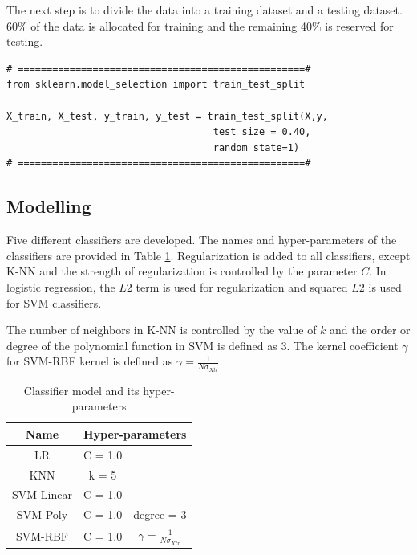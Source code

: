 The next step is to divide the data into a training dataset and a testing dataset. 60\% of the data is allocated for training and the remaining 40\% is reserved for testing.

\begin{lstlisting}
# ==================================================#
from sklearn.model_selection import train_test_split

X_train, X_test, y_train, y_test = train_test_split(X,y,
                                    test_size = 0.40,
                                    random_state=1)
# ==================================================#
\end{lstlisting}

\subsection{Modelling}
Five different classifiers are developed. The names and hyper-parameters of the classifiers are provided in Table \ref{tb:clf_parameters}.
Regularization is added to all classifiers, except K-NN and the strength of regularization is controlled by the parameter $C$. In logistic regression, the $L2$ term is used for regularization and squared $L2$ is used for SVM classifiers.

The number of neighbors in K-NN is controlled by the value of $k$ and the order or degree of the polynomial function in SVM is defined as $3$. The kernel coefficient $\gamma$ for SVM-RBF kernel is defined as $\gamma = \frac{1}{N\sigma_{Xtr}}$.

\begin{table}[!ht]
\centering
\begin{tabular}{|c|c|c| }
  \hline
  Name & \multicolumn{2}{|c|}{Hyper-parameters}\\
  \hline
  LR  & C = 1.0& \\
  \hline
  KNN & k = 5  & \\
  \hline
  SVM-Linear & C = 1.0 &   \\
  \hline
  SVM-Poly &  C = 1.0  &  degree = 3\\
  \hline
  SVM-RBF & C = 1.0    & $\gamma = \frac{1}{N\sigma_{Xtr}}$\\
  \hline
\end{tabular}
\caption{Classifier model and its hyper-parameters}\label{tb:clf_parameters}
\end{table}

